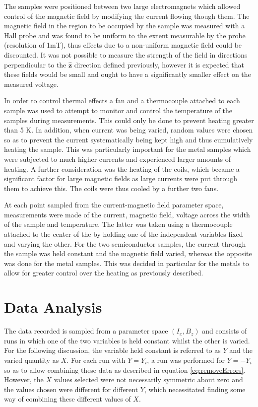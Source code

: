 \documentclass{article}
\begin{document}
		The samples were positioned between two large electromagnets which allowed control of the magnetic field by modifying the current flowing though them. The magnetic field in the region to be occupied by the sample was measured with a Hall probe and was found to be uniform to the extent measurable by the probe (resolution of 1mT), thus effects due to a non-uniform magnetic field could be discounted. It was not possible to measure the strength of the field in directions perpendicular to the $\hat{\mathbf{z}}$ direction defined previously, however it is expected that these fields would be small and ought to have a significantly smaller effect on the measured voltage.
		
		In order to control thermal effects a fan and a thermocouple attached to each sample was used to attempt to monitor and control the temperature of the samples during measurements. This could only be done to prevent heating greater than 5 K. In addition, when current was being varied, random values were chosen so as to prevent the current systematically being kept high and thus cumulatively heating the sample. This was particularly important for the metal samples which were subjected to much higher currents and experienced larger amounts of heating. A further consideration was the heating of the coils, which became a significant factor for large magnetic fields as large currents were put through them to achieve this. The coils were thus cooled by a further two fans.
		
		At each point sampled from the current-magnetic field parameter space, measurements were made of the current, magnetic field, voltage across the width of the sample and temperature. The latter was taken using a thermocouple attached to the center of the by holding one of the independent variables fixed and varying the other. For the two semiconductor samples, the current through the sample was held constant and the magnetic field varied, whereas the opposite was done for the metal samples. This was decided in particular for the metals to allow for greater control over the heating as previously described.
	
	\section{Data Analysis}
		The data recorded is sampled from a parameter space $(I_x,B_z)$ and consists of runs in which one of the two variables is held constant whilst the other is varied. For the following discussion, the variable held constant is referred to as $Y$ and the varied quantity as $X$. For each run with $Y = Y_i$, a run was performed for $Y = -Y_i$ so as to allow combining these data as described in equation \ref{eq:removeErrors}. However, the $X$ values selected were not necessarily symmetric about zero and the values chosen were different for different $Y$, which necessitated finding some way of combining these different values of $X$.
		
\end{document}
